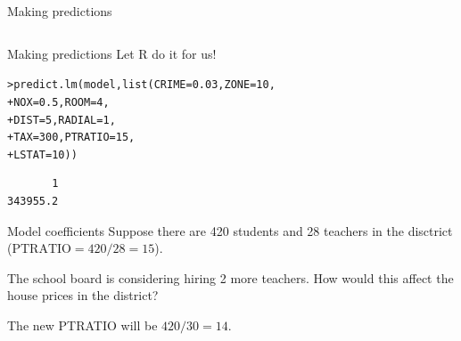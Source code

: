\documentclass{beamer}\usepackage[]{graphicx}\usepackage[]{color}
\makeatletter
\newcommand{\hlnum}[1]{\textcolor[rgb]{0.824,0.412,0.118}{#1}}%
\newcommand{\hlstd}[1]{\textcolor[rgb]{1,0.894,0.769}{#1}}%
\newcommand{\hlkwc}[1]{\textcolor[rgb]{0.78,0.941,0.545}{#1}}%
\newcommand{\hlkwd}[1]{\textcolor[rgb]{1,0.78,0.769}{#1}}%
\newenvironment{kframe}{%
 \def\at@end@of@kframe{}%
 \ifinner\ifhmode%
  \def\at@end@of@kframe{\end{minipage}}%
  \begin{minipage}{\columnwidth}%
 \fi\fi%
 \def\FrameCommand##1{\hskip\@totalleftmargin \hskip-\fboxsep
 \colorbox{shadecolor}{##1}\hskip-\fboxsep
     \hskip-\linewidth \hskip-\@totalleftmargin \hskip\columnwidth}%
 \MakeFramed {\advance\hsize-\width
   \@totalleftmargin\z@ \linewidth\hsize
   \@setminipage}}%
 {\par\unskip\endMakeFramed%
 \at@end@of@kframe}
\newenvironment{knitrout}{}{} %
\makeatother
\begin{document}
\begin{darkframes}
\begin{frame}[fragile]{Making predictions}
\begin{table}[!b]
{\begin{tabularx}{\textwidth}{XXrrr}
        \end{tabularx}}

      \end{table}

    \end{frame}



    \begin{frame}[fragile]{Making predictions}
      Let R do it for us!

\begin{knitrout}
\begin{kframe}
\begin{alltt}
\hlstd{> }\hlkwd{predict.lm}\hlstd{(model,} \hlkwd{list}\hlstd{(}\hlkwc{CRIME}\hlstd{=}\hlnum{0.03}\hlstd{,} \hlkwc{ZONE}\hlstd{=}\hlnum{10}\hlstd{,}
\hlstd{+ }                       \hlkwc{NOX}\hlstd{=}\hlnum{0.5}\hlstd{,} \hlkwc{ROOM}\hlstd{=}\hlnum{4}\hlstd{,}
\hlstd{+ }                       \hlkwc{DIST}\hlstd{=}\hlnum{5}\hlstd{,}  \hlkwc{RADIAL}\hlstd{=}\hlnum{1}\hlstd{,}
\hlstd{+ }                       \hlkwc{TAX}\hlstd{=}\hlnum{300}\hlstd{,} \hlkwc{PTRATIO}\hlstd{=}\hlnum{15}\hlstd{,}
\hlstd{+ }                       \hlkwc{LSTAT}\hlstd{=}\hlnum{10}\hlstd{))}
\end{alltt}
\begin{verbatim}
       1 
343955.2 
\end{verbatim}
\end{kframe}
\end{knitrout}

    \end{frame}


    \begin{frame}[fragile]{Model coefficients}
      Suppose there are 420 students and 28 teachers in the disctrict ($\text{PTRATIO}=420/28=15$). \pause

      \bigskip

      The school board is considering hiring 2 more teachers. How would this affect the house prices in the district? \pause

      \bigskip

      The new PTRATIO will be $420/30=14$. \pause


\end{frame}
\end{darkframes}
\end{document}
